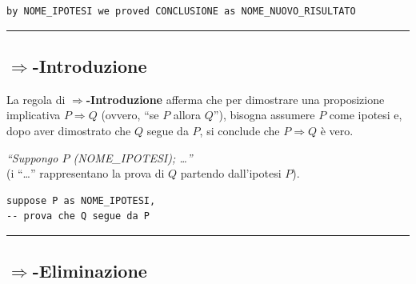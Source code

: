 \documentclass[
  a4paper,
]{article}
\begin{document}
\begin{examplebox}

\begin{lstlisting}
by NOME_IPOTESI we proved CONCLUSIONE as NOME_NUOVO_RISULTATO
\end{lstlisting}

\end{examplebox}

\par\noindent\rule{\linewidth}{0.4pt}\par\vspace{6pt}

\hypertarget{rightarrow-introduzione}{%
\subsection{\texorpdfstring{\(\Rightarrow\)-Introduzione}{\textbackslash Rightarrow-Introduzione}}\label{rightarrow-introduzione}}

La regola di \textbf{\(\Rightarrow\)-Introduzione} afferma che per
dimostrare una proposizione implicativa \(P \Rightarrow Q\) (ovvero,
``se \(P\) allora \(Q\)''), bisogna assumere \(P\) come ipotesi e, dopo
aver dimostrato che \(Q\) segue da \(P\), si conclude che
\(P \Rightarrow Q\) è vero.

\begin{examplebox}[Esempio]

\emph{``Suppongo \(P\) (NOME\_IPOTESI); \ldots{}''}\\
(i ``\ldots{}'' rappresentano la prova di \(Q\) partendo dall'ipotesi
\(P\)).

\end{examplebox}

\begin{examplebox}

\begin{lstlisting}
suppose P as NOME_IPOTESI,
-- prova che Q segue da P
\end{lstlisting}

\end{examplebox}

\par\noindent\rule{\linewidth}{0.4pt}\par\vspace{6pt}

\hypertarget{rightarrow-eliminazione}{%
\subsection{\texorpdfstring{\(\Rightarrow\)-Eliminazione}{\textbackslash Rightarrow-Eliminazione}}\label{rightarrow-eliminazione}}
\end{document}
